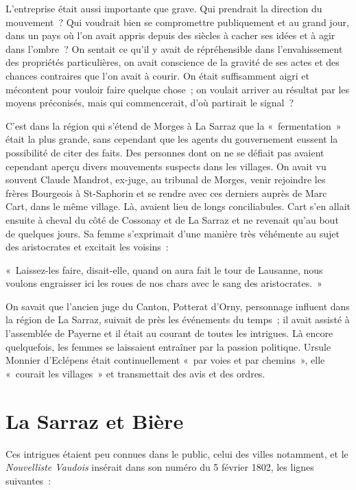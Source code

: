 \documentclass[french,twoside]{book} %
\newenvironment{quoteblock}%
  {\begin{quoting}}
  {\end{quoting}}
\newenvironment{quotebar}{%
    \def\FrameCommand{{\color{rubric!10!}\vrule width 0.5em} \hspace{0.9em}}%
    \def\OuterFrameSep{\itemsep} %
    \MakeFramed {\advance\hsize-\width \FrameRestore}
  }%
  {%
    \endMakeFramed
  }
\renewenvironment{quoteblock}%
  {%
    \savenotes
    \setstretch{0.9}
    \normalfont
    \begin{quotebar}
  }
  {%
    \end{quotebar}
    \spewnotes
  }
\begin{document}
L’entreprise était aussi importante que grave. Qui prendrait la direction du mouvement ? Qui voudrait bien se compromettre publiquement et au grand jour, dans un pays où l’on avait appris depuis des siècles à cacher ses idées et à agir dans l’ombre ? On sentait ce qu’il y avait de répréhensible dans l’envahissement des propriétés particulières, on avait conscience de la gravité de ses actes et des chances contraires que l’on avait à courir. On était suffisamment aigri et mécontent pour vouloir faire quelque chose ; on voulait arriver au résultat par les moyens préconisés, mais qui commencerait, d’où partirait le signal ?\par
C’est dans la région qui s’étend de Morges à La Sarraz que la « fermentation » était la plus grande, sans cependant que les agents du gouvernement eussent la possibilité de citer des faits. Des personnes dont on ne se défiait pas avaient cependant aperçu divers mouvements suspects dans les villages. On avait vu souvent Claude Mandrot, ex-juge, au tribunal de Morges, venir rejoindre les frères Bourgeois à St-Saphorin et se rendre avec ces derniers auprès de Marc Cart, dans le même village. Là, avaient lieu de longs conciliabules. Cart s’en allait ensuite à cheval du côté de Cossonay et de La Sarraz et ne revenait qu’au bout de quelques jours. Sa femme s’exprimait d’une manière très véhémente au sujet des aristocrates et excitait les voisins :\par

\begin{quoteblock}
\noindent « Laissez-les faire, disait-elle, quand on aura fait le tour de Lausanne, nous voulons engraisser ici les roues de nos chars avec le sang des aristocrates. »\end{quoteblock}

\noindent On savait que l’ancien juge du Canton, Potterat d’Orny, personnage influent dans la région de La Sarraz, suivait de près les événements du temps ; il avait assisté à l’assemblée de Payerne et il était au courant de toutes les intrigues. Là encore quelquefois, les femmes se laissaient entraîner par la passion politique. Ursule Monnier d’Eclépens était continuellement « par voies et par chemins », elle « courait les villages » et transmettait des avis et des ordres.
\section[{La Sarraz et Bière}]{La Sarraz et Bière}
\noindent Ces intrigues étaient peu connues dans le public, celui des villes notamment, et le \emph{Nouvelliste Vaudois} insérait dans son numéro du 5 février 1802, les lignes suivantes :\par
\end{document}
